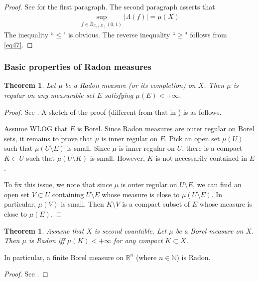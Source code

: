 \documentclass[12pt,b5paper,notitlepage]{article}
\theoremstyle{definition}
\theoremstyle{plain}
\newtheorem{thm}[df]{Theorem}
\newcommand{\ovl}{\overline}
\newcommand{\Nbb}{\mathbb N}
\newcommand{\Rbb}{\mathbb R}
\numberwithin{equation}{section}
\begin{document}
\begin{proof}
See \cite[Sec. 25.3]{Gui-A} for the first paragraph. The second paragraph asserts that
\begin{align*}
\sup_{f\in\ovl B_{C_c(X)}(0,1)}|\Lambda(f)|= \mu(X)
\end{align*}
The inequality ``$\leq$" is obvious. The reverse inequality ``$\geq$" follows from \eqref{eq47}.
\end{proof}



\subsubsection{Basic properties of Radon measures}

\begin{thm}\label{lb101}
Let $\mu$ be a Radon measure (or its completion) on $X$. Then $\mu$ is regular on any measurable set $E$ satisfying $\mu(E)<+\infty$.
\end{thm}

\begin{proof}
See \cite[Sec. 25.4]{Gui-A}. A sketch of the proof (different from that in \cite{Gui-A}) is as follows. 

Assume WLOG that $E$ is Borel. Since Radon measures are outer regular on Borel sets, it remains to prove that $\mu$ is inner regular on $E$. Pick an open set $\mu(U)$ such that $\mu(U\setminus E)$ is small. Since $\mu$ is inner regular on $U$, there is a compact $K\subset U$ such that $\mu(U\setminus K)$ is small. However, $K$ is not necessarily contained in $E$. 

To fix this issue, we note that since $\mu$ is outer regular on $U\setminus E$, we can find an open set $V\subset U$ containing $U\setminus E$ whose measure is close to $\mu(U\setminus E)$. In particular, $\mu(V)$ is small. Then $K\setminus V$ is a compact subset of $E$ whose measure is close to $\mu(E)$.
\end{proof}



\begin{thm}\label{lb64}
Assume that $X$ is second countable. Let $\mu$ be a Borel measure on $X$. Then $\mu$ is Radon iff $\mu(K)<+\infty$ for any compact $K\subset X$.
\end{thm}

In particular, a finite Borel measure on $\Rbb^n$ (where $n\in\Nbb$) is Radon.

\begin{proof}
See \cite[Sec. 25.5]{Gui-A}.
\end{proof}
\end{document}
